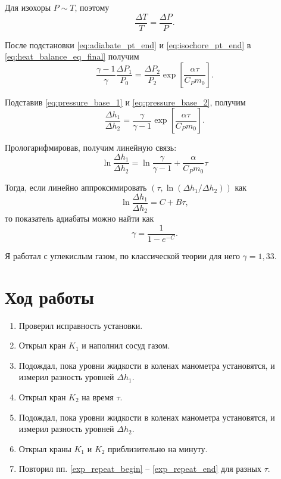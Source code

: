 \documentclass[12pt]{article}
\begin{document}
	Для изохоры $P \sim T$, поэтому
	\begin{equation}
	\label{eq:isochore_pt_end}
	\frac{\Delta T}{T}=\frac{\Delta P}{P}.
	\end{equation}
	
	После подстановки \eqref{eq:adiabate_pt_end} и \eqref{eq:isochore_pt_end} в \eqref{eq:heat_balance_eq_final} получим
	\begin{equation}
	\label{eq:compilation_raw}
	\frac{\gamma-1}{\gamma} \frac{\Delta P_1}{P_0} = \frac{\Delta P_2}{P_2} \exp \left[ \frac{\alpha \tau}{C_P m_0} \right].
	\end{equation}
	
	Подставив \eqref{eq:pressure_base_1} и \eqref{eq:pressure_base_2}, получим
	\begin{equation}
	\label{eq:compilation_final}
	\frac{\Delta h_1}{\Delta h_2} = \frac{\gamma}{\gamma -1} \exp \left[ \frac{\alpha \tau}{C_P m_0} \right].
	\end{equation}
	
	Прологарифмировав, получим линейную связь:
	\begin{equation}
	\label{eq:log_lin_theory}
	\ln \frac{\Delta h_1}{\Delta h_2} = \ln \frac{\gamma}{\gamma -1} + \frac{\alpha}{C_P m_0} \tau
	\end{equation}
	
	Тогда, если линейно аппроксимировать $\left( \tau, \ln \left( \Delta h_1/ \Delta h_2 \right) \right)$ как
	\begin{equation}
	\label{eq:exp_linearisation}
	\ln \frac{\Delta h_1}{\Delta h_2} = C + B \tau,
	\end{equation}
	то показатель адиабаты можно найти как
	\begin{equation}
	\label{eq:gamma_from_exp}
	\gamma = \frac{1}{1-e^{-C}}.
	\end{equation}
	
	Я работал с углекислым газом, по классической теории для него $\gamma=1{,}33$.
	
	\section*{Ход работы}
	
	\begin{enumerate}
	\item Проверил исправность установки.
	\item Открыл кран $K_1$ и наполнил сосуд газом. \label{exp_repeat_begin}
	\item Подождал, пока уровни жидкости в коленах манометра установятся, и измерил разность уровней $\Delta h_1$.
	\item Открыл кран $K_2$ на время $\tau$.
	\item Подождал, пока уровни жидкости в коленах манометра установятся, и измерил разность уровней $\Delta h_2$.
	\item Открыл краны $K_1$ и $K_2$ приблизительно на минуту. \label{exp_repeat_end}
	\item Повторил пп. \ref{exp_repeat_begin} -- \ref{exp_repeat_end} для разных $\tau$.
	\end{enumerate}
	
\end{document}
